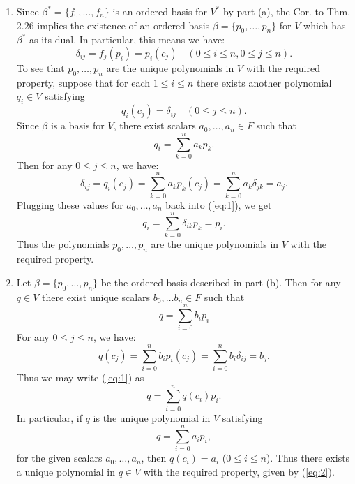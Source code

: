 \documentclass[12pt]{article}
\begin{document}
\begin{enumerate}
\begin{enumerate}
\item
Since $\beta^\ast = \{f_0, \dots, f_n\}$ is an ordered basis for $V^\ast$ by part (a), the Cor. to Thm. 2.26 implies the existence of an ordered basis $\beta = \{p_0, \dots, p_n\}$ for $V$ which has $\beta^\ast$ as its dual. In particular, this means we have:
\begin{equation*}
\delta_{ij} = f_j(p_i) = p_i(c_j) \quad (0 \leq i \leq n, 0 \leq j \leq n).
\end{equation*}
To see that $p_0, \dots, p_n$ are the unique polynomials in $V$ with the required property, suppose that for each $1 \leq i \leq n$ there exists another polynomial $q_i \in V$ satisfying
\begin{equation*}
q_i(c_j) = \delta_{ij} \quad (0 \leq j \leq n).
\end{equation*}
Since $\beta$ is a basis for $V$, there exist scalars $a_0, \dots, a_n \in F$ such that
\begin{equation} \label{eq:1}
q_i = \sum_{k=0}^n a_k p_k.
\end{equation}
Then for any $0 \leq j \leq n$, we have:
\begin{equation*}
\delta_{ij} = q_i(c_j) = \sum_{k=0}^n a_k p_k(c_j) = \sum_{k=0}^n a_k \delta_{jk} = a_j.
\end{equation*}
Plugging these values for $a_0, \dots, a_n$ back into (\ref{eq:1}), we get
\begin{equation*} \label{eq:1}
q_i = \sum_{k=0}^n \delta_{ik} p_k = p_i.
\end{equation*}
Thus the polynomials $p_0, \dots, p_n$ are the unique polynomials in $V$ with the required property.

\item
\setcounter{equation}{0}

Let $\beta = \{p_0, \dots, p_n\}$ be the ordered basis described in part (b). Then for any $q \in V$ there exist unique scalars $b_0, \dots b_n \in F$ such that
\begin{equation} \label{eq:1}
q = \sum_{i=0}^n b_i p_i
\end{equation}
For any $0 \leq j \leq n$, we have:
\begin{equation*}
q(c_j) = \sum_{i=0}^n b_i p_i(c_j) = \sum_{i=0}^n b_i \delta_{ij} = b_j.
\end{equation*}
Thus we may write (\ref{eq:1}) as
\begin{equation*}
q = \sum_{i=0}^n q(c_i) p_i.
\end{equation*}
In particular, if $q$ is the unique polynomial in $V$ satisfying
\begin{equation} \label{eq:2}
q = \sum_{i=0}^n a_i p_i,
\end{equation}
for the given scalars $a_0, \dots, a_n$, then $q(c_i) = a_i$ ($0 \leq i \leq n$). Thus there exists a unique polynomial in $q \in V$ with the required property, given by (\ref{eq:2}).


\end{enumerate}
\end{enumerate}
\end{document}
